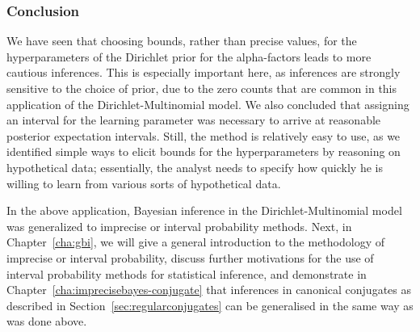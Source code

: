 \subsubsection{Conclusion}

We have seen that choosing bounds, rather than precise values,
for the hyperparameters of the Dirichlet prior for the alpha-factors
leads to more cautious inferences.
This is especially important here,
as inferences are strongly sensitive to the choice of prior,
due to the zero counts that are common in this application of the Dirichlet-Multinomial model.
We also concluded that assigning an interval for the learning parameter was necessary
to arrive at reasonable posterior expectation intervals.
Still, the method is relatively easy to use, as
we identified simple ways to elicit bounds for the hyperparameters
by reasoning on hypothetical data;
essentially, the analyst needs to specify how quickly he is willing to learn
from various sorts of hypothetical data.

\medskip

In the above application, Bayesian inference in the Dirichlet-Multinomial model
was generalized to imprecise or interval probability methods.
Next, in Chapter~\ref{cha:gbi},
we will give a general introduction to the methodology of imprecise or interval probability,
discuss further motivations for the use of interval probability methods for statistical inference,
and demonstrate in Chapter~\ref{cha:imprecisebayes-conjugate} that inferences in canonical conjugates
as described in Section~\ref{sec:regularconjugates}
can be generalised in the same way as was done above.
